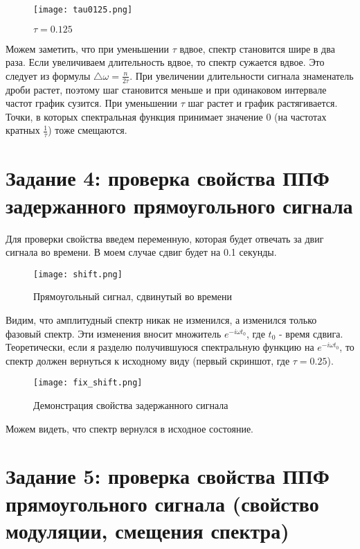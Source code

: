 \begin{figure}[H]
    \centering
    \texttt{[image: tau0125.png]}
    \caption{$\tau = 0.125$}
\end{figure}

Можем заметить, что при уменьшении $\tau$ вдвое, спектр становится шире в два раза. Если увеличиваем длительность вдвое, то спектр
сужается вдвое. Это следует из формулы $\triangle \omega = \frac{n}{2\tau}$. При увеличении длительности сигнала знаменатель дроби
растет, поэтому шаг становится меньше и при одинаковом интервале частот график сузится. При уменьшении $\tau$ шаг растет и график
растягивается. Точки, в которых спектральная функция принимает значение 0 (на частотах кратных $\frac{1}{\tau}$) тоже смещаются.

\section*{\textbf{Задание 4: проверка свойства ППФ задержанного прямоугольного сигнала}}

Для проверки свойства введем переменную, которая будет отвечать за двиг сигнала во времени. В моем случае сдвиг будет на 0.1 секунды.

\begin{figure}[H]
    \centering
    \texttt{[image: shift.png]}
    \caption{Прямоугольный сигнал, сдвинутый во времени}
\end{figure}

Видим, что амплитудный спектр никак не изменился, а изменился только фазовый спектр. Эти изменения вносит множитель $e^{-i\omega t_0}$,
где $t_0$ - время сдвига. Теоретически, если я разделю получившуюся спектральную функцию на $e^{-i\omega t_0}$, то спектр должен вернуться
к исходному виду (первый скриншот, где $\tau = 0.25$).

\begin{figure}[H]
    \centering
    \texttt{[image: fix\_shift.png]}
    \caption{Демонстрация свойства задержанного сигнала}
\end{figure}

Можем видеть, что спектр вернулся в исходное состояние.

\section*{\textbf{Задание 5: проверка свойства ППФ прямоугольного сигнала (свойство модуляции, смещения спектра)}}

